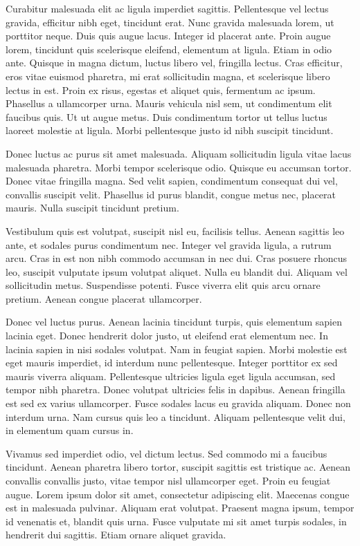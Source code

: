 Curabitur malesuada elit ac ligula imperdiet sagittis. Pellentesque vel lectus gravida, efficitur nibh eget, tincidunt erat. Nunc gravida malesuada lorem, ut porttitor neque. Duis quis augue lacus. Integer id placerat ante. Proin augue lorem, tincidunt quis scelerisque eleifend, elementum at ligula. Etiam in odio ante. Quisque in magna dictum, luctus libero vel, fringilla lectus. Cras efficitur, eros vitae euismod pharetra, mi erat sollicitudin magna, et scelerisque libero lectus in est. Proin ex risus, egestas et aliquet quis, fermentum ac ipsum. Phasellus a ullamcorper urna. Mauris vehicula nisl sem, ut condimentum elit faucibus quis. Ut ut augue metus. Duis condimentum tortor ut tellus luctus laoreet molestie at ligula. Morbi pellentesque justo id nibh suscipit tincidunt.

Donec luctus ac purus sit amet malesuada. Aliquam sollicitudin ligula vitae lacus malesuada pharetra. Morbi tempor scelerisque odio. Quisque eu accumsan tortor. Donec vitae fringilla magna. Sed velit sapien, condimentum consequat dui vel, convallis suscipit velit. Phasellus id purus blandit, congue metus nec, placerat mauris. Nulla suscipit tincidunt pretium.

Vestibulum quis est volutpat, suscipit nisl eu, facilisis tellus. Aenean sagittis leo ante, et sodales purus condimentum nec. Integer vel gravida ligula, a rutrum arcu. Cras in est non nibh commodo accumsan in nec dui. Cras posuere rhoncus leo, suscipit vulputate ipsum volutpat aliquet. Nulla eu blandit dui. Aliquam vel sollicitudin metus. Suspendisse potenti. Fusce viverra elit quis arcu ornare pretium. Aenean congue placerat ullamcorper.

Donec vel luctus purus. Aenean lacinia tincidunt turpis, quis elementum sapien lacinia eget. Donec hendrerit dolor justo, ut eleifend erat elementum nec. In lacinia sapien in nisi sodales volutpat. Nam in feugiat sapien. Morbi molestie est eget mauris imperdiet, id interdum nunc pellentesque. Integer porttitor ex sed mauris viverra aliquam. Pellentesque ultricies ligula eget ligula accumsan, sed tempor nibh pharetra. Donec volutpat ultricies felis in dapibus. Aenean fringilla est sed ex varius ullamcorper. Fusce sodales lacus eu gravida aliquam. Donec non interdum urna. Nam cursus quis leo a tincidunt. Aliquam pellentesque velit dui, in elementum quam cursus in.

Vivamus sed imperdiet odio, vel dictum lectus. Sed commodo mi a faucibus tincidunt. Aenean pharetra libero tortor, suscipit sagittis est tristique ac. Aenean convallis convallis justo, vitae tempor nisl ullamcorper eget. Proin eu feugiat augue. Lorem ipsum dolor sit amet, consectetur adipiscing elit. Maecenas congue est in malesuada pulvinar. Aliquam erat volutpat. Praesent magna ipsum, tempor id venenatis et, blandit quis urna. Fusce vulputate mi sit amet turpis sodales, in hendrerit dui sagittis. Etiam ornare aliquet gravida.

